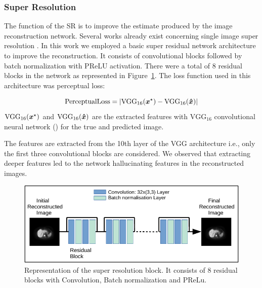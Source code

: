 \subsubsection{Super Resolution}
The function of the \ac{SR} is to improve the estimate produced by the image reconstruction network. Several works already exist concerning single image super resolution \cite{ledig2017photo,lim2017enhanced}. In this work we employed a basic super residual network architecture to improve the reconstruction. It consists of convolutional blocks followed by batch normalization with \ac{PReLU} activation. There were a total of 8 residual blocks in the network as represented in Figure~\ref{fig:super}. The loss function used in this architecture was perceptual loss:

\begin{equation}
\mathrm{Perceptual Loss} =  |\mathrm{VGG}_{16}(\bm{x}^\star) -\mathrm{VGG}_{16}( \bm{\hat{x}})| 
\end{equation}
$\mathrm{VGG}_{16}(\bm{x}^\star)$ and $\mathrm{VGG}_{16}( \bm{\hat{x}})$ are the extracted features with $\mathrm{VGG}_{16}$ convolutional neural network (\cite{simonyan2014very}) for the true and predicted image.

The features are extracted from the 10th layer of the VGG architecture i.e., only the first three convolutional blocks are considered. We observed that extracting deeper features led to the network hallucinating features in the reconstructed images.

\begin{figure}[!htbp]
	\centering
	\includegraphics[width=0.99\linewidth]{./Figures/super-crop.pdf}
	\caption{Representation of the super resolution block. It consists of 8 residual blocks with Convolution, Batch normalization and PReLu.}
	\label{fig:super}
\end{figure}

